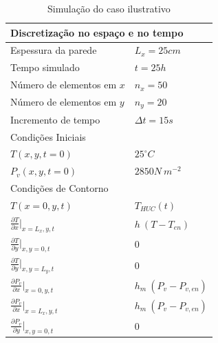   \setlength{\tabcolsep}{38pt}
  
\begin{table}[]
\centering
\caption{Simulação do caso ilustrativo}
\label{tab:case_ics_bcs}
\addtolength{\tabcolsep}{-10pt}
\begin{tabular}{|ll|}
\hline
\multicolumn{2}{|l|}{Discretização no espaço e no tempo}                                    \\ \hline
Espessura da parede                                          & $L_x = 25 cm$                \\
Tempo simulado                                               & $t = 25 h$                   \\
Número de elementos em $x$                                   & $n_x = 50$                   \\
Número de elementos em $y$                                   & $n_y = 20$                   \\
Incremento de tempo                                          & $\Delta t = 15 s$            \\ \hline
\multicolumn{2}{|l|}{Condições Iniciais}                                                    \\ \hline
$T(x, y, t=0)$                                               & $ 25 ^{\circ}C$              \\
$P_v(x, y, t=0)$                                             & $ 2850 N \ m^{-2} $          \\ \hline
\multicolumn{2}{|l|}{Condições de Contorno}                                                 \\ \hline
$T(x=0, y, t)$                                               & $T_{HUC}(t)$                 \\
$\frac{\partial T}{\partial x}\bigg\rvert_{x = L_x, y, t}$   & $h \ (T - T_{en})$           \\
$\frac{\partial T}{\partial y}\bigg\rvert_{x, y=0, t}$       & $0$                          \\
$\frac{\partial T}{\partial y}\bigg\rvert_{x, y=L_y, t}$     & $0$                          \\
$\frac{\partial P_v}{\partial x}\bigg\rvert_{x = 0, y, t}$   & $h_m \ (P_v - P_{v, en})$    \\
$\frac{\partial P_v}{\partial x}\bigg\rvert_{x = L_x, y, t}$ & $h_m \ (P_v - P_{v, en})$    \\
$\frac{\partial P_v}{\partial y}\bigg\rvert_{x, y=0, t}$     & $0$                          \\

\end{tabular}
\end{table}
